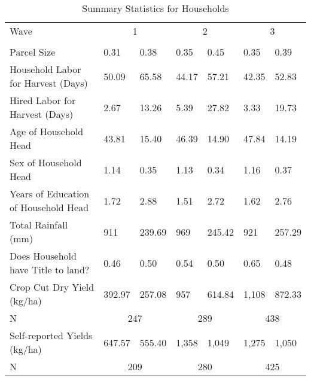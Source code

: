 \begin{table}
\caption{Summary Statistics for Households}
\label{tbl:summary}
\begin{tabular}{lllllll}
\toprule
Wave & \multicolumn{2}{c}{1} & \multicolumn{2}{c}{2} & \multicolumn{2}{c}{3} \\
 &  &  &  &  &  &  \\
\midrule
Parcel Size & 0.31 & 0.38 & 0.35 & 0.45 & 0.35 & 0.39 \\
Household Labor for Harvest (Days) & 50.09 & 65.58 & 44.17 & 57.21 & 42.35 & 52.83 \\
Hired Labor for Harvest (Days) & 2.67 & 13.26 & 5.39 & 27.82 & 3.33 & 19.73 \\
Age of Household Head & 43.81 & 15.40 & 46.39 & 14.90 & 47.84 & 14.19 \\
Sex of Household Head & 1.14 & 0.35 & 1.13 & 0.34 & 1.16 & 0.37 \\
Years of Education of Household Head & 1.72 & 2.88 & 1.51 & 2.72 & 1.62 & 2.76 \\
Total Rainfall (mm) & 911 & 239.69 & 969 & 245.42 & 921 & 257.29 \\
Does Household have Title to land? & 0.46 & 0.50 & 0.54 & 0.50 & 0.65 & 0.48 \\
Crop Cut Dry Yield (kg/ha) & 392.97 & 257.08 & 957 & 614.84 & 1,108 & 872.33 \\
\midrule
N & \multicolumn{2}{c}{247}&\multicolumn{2}{c}{289}&\multicolumn{2}{c}{438}\\
\midrule
Self-reported Yields (kg/ha) & 647.57 & 555.40 & 1,358 & 1,049 & 1,275 & 1,050 \\
\midrule
N & \multicolumn{2}{c}{209}&\multicolumn{2}{c}{280}&\multicolumn{2}{c}{425}\\
\bottomrule
\end{tabular}
\end{table}
